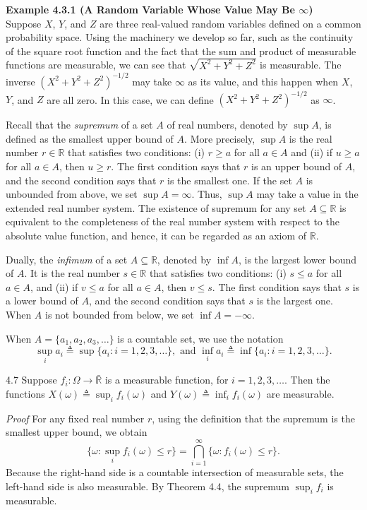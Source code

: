 \textbf{Example 4.3.1 (A Random Variable Whose Value May Be $\infty$)} \\
Suppose $X$, $Y$, and $Z$ are three real-valued random variables defined on a common probability space. Using the machinery we develop so far, such as the continuity of the square root function and the fact that the sum and product of measurable functions are measurable, we can see that $\sqrt{X^2 + Y^2 + Z^2}$ is measurable. The inverse $(X^2 + Y^2 + Z^2)^{-1/2}$ may take $\infty$ as its value, and this happen when $X$, $Y$, and $Z$ are all zero. In this case, we can define $(X^2 + Y^2 + Z^2)^{-1/2}$ as $\infty$.

Recall that the \textit{supremum} of a set $A$ of real numbers, denoted by $\sup A$, is defined as the smallest upper bound of $A$. More precisely, $\sup A$ is the real number $r \in \mathbb{R}$ that satisfies two conditions: (i) $r \ge a$ for all $a \in A$ and (ii) if $u \ge a$ for all $a \in A$, then $u \ge r$. The first condition says that $r$ is an upper bound of $A$, and the second condition says that $r$ is the smallest one. If the set $A$ is unbounded from above, we set $\sup A = \infty$. Thus, $\sup A$ may take a value in the extended real number system. The existence of supremum for any set $A \subseteq \mathbb{R}$ is equivalent to the completeness of the real number system with respect to the absolute value function, and hence, it can be regarded as an axiom of $\mathbb{R}$.

Dually, the \textit{infimum} of a set $A \subseteq \mathbb{R}$, denoted by $\inf A$, is the largest lower bound of $A$. It is the real number $s \in \mathbb{R}$ that satisfies two conditions: (i) $s \le a$ for all $a \in A$, and (ii) if $v \le a$ for all $a \in A$, then $v \le s$. The first condition says that $s$ is a lower bound of $A$, and the second condition says that $s$ is the largest one. When $A$ is not bounded from below, we set $\inf A = -\infty$.

When $A = \{a_1, a_2, a_3, \dots\}$ is a countable set, we use the notation
\[
\sup_i a_i \triangleq \sup\{a_i : i = 1, 2, 3, \dots\}, \text{ and } \inf_i a_i \triangleq \inf\{a_i : i = 1, 2, 3, \dots\}.
\]

\begin{thmbox}{4.7}
Suppose $f_i : \Omega \to \bar{\mathbb{R}}$ is a measurable function, for $i = 1, 2, 3, \dots$. Then the functions $X(\omega) \triangleq \sup_i f_i(\omega)$ and $Y(\omega) \triangleq \inf_i f_i(\omega)$ are measurable.
\end{thmbox}
\noindent\textit{Proof} For any fixed real number $r$, using the definition that the supremum is the smallest upper bound, we obtain
\[
\{\omega : \sup_i f_i(\omega) \le r\} = \bigcap_{i=1}^{\infty} \{\omega : f_i(\omega) \le r\}.
\]
Because the right-hand side is a countable intersection of measurable sets, the left-hand side is also measurable. By Theorem 4.4, the supremum $\sup_i f_i$ is measurable.

